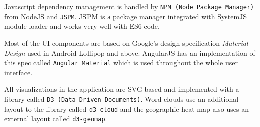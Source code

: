 Javascript dependency management is handled by \texttt{NPM (Node Package Manager)} from NodeJS and \texttt{JSPM}. JSPM is а package manager integrated with SystemJS module loader and works very well with ES6 code.

Most of the UI components are based on Google's design specification \textit{Material Design} used in Android Lollipop and above. AngularJS has an implementation of this spec called \texttt{Angular Material} which is used throughout the whole user interface.

All visualizations in the application are SVG-based and implemented with a library called \texttt{D3 (Data Driven Documents)}. Word clouds use an additional layout to the library called \texttt{d3-cloud} and the geographic heat map also uses an external layout called \texttt{d3-geomap}.
